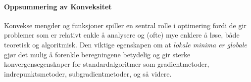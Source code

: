 \paragraph{Oppsummering av Konveksitet}
Konvekse mengder og funksjoner spiller en sentral rolle i optimering fordi de gir problemer som er relativt enkle å analysere og (ofte) mye enklere å løse, både teoretisk og algoritmisk. 
Den viktige egenskapen om at \emph{lokale minima er globale} gjør det mulig å forenkle beregningene betydelig og gir sterke konvergensegenskaper for standardalgoritmer som gradientmetoder, indrepunktsmetoder, subgradientmetoder, og så videre.
